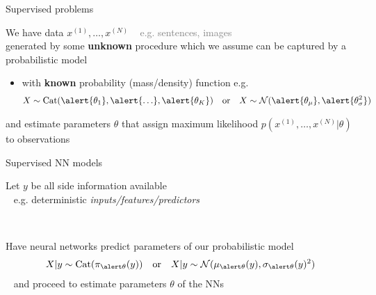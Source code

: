 \begin{frame}{Supervised problems}

We have data $x^{(1)}, \ldots,  x^{(N)}$ \textcolor{gray}{~ e.g. sentences, images} \\
generated by some {\bf unknown} procedure 
which we assume can be captured by a probabilistic model


\begin{itemize}
	\item with {\bf known} probability (mass/density) function e.g.
	\begin{align*}
    X \sim \Cat(\alert{\theta_1}, \alert{\ldots}, \alert{\theta_K}) & & \text{or} & & X \sim \mathcal N(\alert{\theta_\mu}, \alert{\theta^2_\sigma})
    \end{align*}    
\end{itemize}
\pause
and \alert{estimate parameters $\theta$}  that assign maximum likelihood $p(x^{(1)}, \ldots, x^{(N)}|\theta)$ to observations

\end{frame}


\begin{frame}{Supervised NN models}

Let $y$ be all side information available\\
~ e.g. deterministic \emph{inputs/features/predictors}

~

Have neural networks predict parameters of our probabilistic model
	\begin{align*}
    X|y \sim \Cat(\pi_{\alert \theta}(y)) & & \text{or} & & X|y \sim \mathcal N(\mu_{\alert \theta}(y), \sigma_{\alert \theta}(y)^2)
    \end{align*}
~ and proceed to \alert{estimate parameters $\theta$}  of the NNs %



\end{frame}



